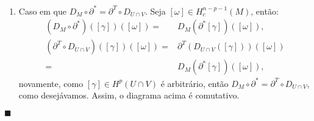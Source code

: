 \documentclass{article}
\begin{document}
\begin{enumerate}
	\item Caso em que $D_{M} \circ \partial^{*} = \partial^{T} \circ D_{U \cap V}$. Seja $[\omega] \in H^{n-p-1}_{c}(M)$, então:
		$$
		\begin{aligned}
		(D_{M} \circ \partial^{*} )([\gamma])([\omega]) =& D_{M}(\partial^{*} [\gamma])([\omega]),
		\\
		(\partial^{T} \circ D_{U \cap V} )([\gamma])([\omega])
		=& \partial^{T}(D_{U \cap V} ([\gamma]))([\omega])
		\\
		=& D_{M}(\partial^{*} [\gamma])([\omega]),
		\end{aligned}
		$$
		novamente, como $[\gamma] \in H^{p}(U \cap V)$ é arbitrário, então $D_{M} \circ \partial^{*} = \partial^{T} \circ D_{U \cap V}$, como desejávamos. Assim, o diagrama acima é comutativo.
	\end{enumerate}
	
	

	
	$\blacksquare$
\end{document}

